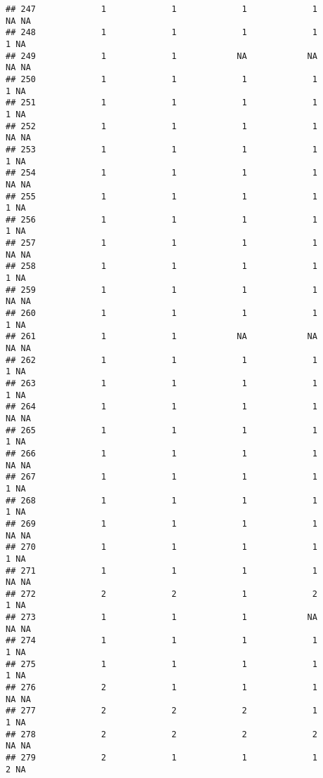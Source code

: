 \documentclass[
]{article}
\begin{document}
\begin{verbatim}
## 247             1             1             1             1            NA NA
## 248             1             1             1             1             1 NA
## 249             1             1            NA            NA            NA NA
## 250             1             1             1             1             1 NA
## 251             1             1             1             1             1 NA
## 252             1             1             1             1            NA NA
## 253             1             1             1             1             1 NA
## 254             1             1             1             1            NA NA
## 255             1             1             1             1             1 NA
## 256             1             1             1             1             1 NA
## 257             1             1             1             1            NA NA
## 258             1             1             1             1             1 NA
## 259             1             1             1             1            NA NA
## 260             1             1             1             1             1 NA
## 261             1             1            NA            NA            NA NA
## 262             1             1             1             1             1 NA
## 263             1             1             1             1             1 NA
## 264             1             1             1             1            NA NA
## 265             1             1             1             1             1 NA
## 266             1             1             1             1            NA NA
## 267             1             1             1             1             1 NA
## 268             1             1             1             1             1 NA
## 269             1             1             1             1            NA NA
## 270             1             1             1             1             1 NA
## 271             1             1             1             1            NA NA
## 272             2             2             1             2             1 NA
## 273             1             1             1            NA            NA NA
## 274             1             1             1             1             1 NA
## 275             1             1             1             1             1 NA
## 276             2             1             1             1            NA NA
## 277             2             2             2             1             1 NA
## 278             2             2             2             2            NA NA
## 279             2             1             1             1             2 NA

\end{verbatim}
\end{document}
